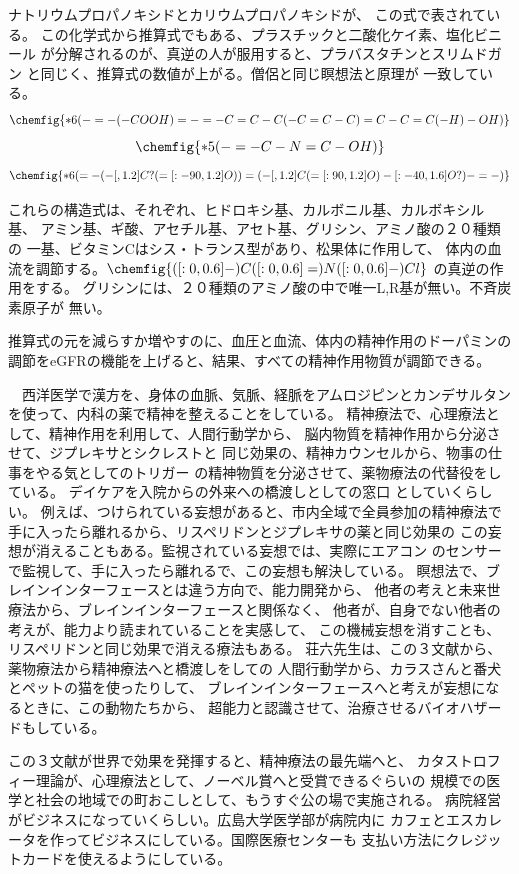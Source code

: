 \documentclass{jsarticle}
\begin{document}
    ナトリウムプロパノキシドとカリウムプロパノキシドが、
    この式で表されている。
   この化学式から推算式でもある、プラスチックと二酸化ケイ素、塩化ビニール
   が分解されるのが、真逆の人が服用すると、プラバスタチンとスリムドガン
   と同じく、推算式の数値が上がる。僧侶と同じ瞑想法と原理が
   一致している。
   $$ \chemfig{*6(-=-(-COOH)=-=-C=C-C(-C=C-C)=C-C=C(-H)-OH)} $$
   $$ \chemfig{*5(-=-C-N=C-OH)} $$
   $$ \chemfig{*6(=-(-[,1.2]C?(=[:-90,1.2]O))=
   (-[,1.2]C(=[:90,1.2]O)-[:-40,1.6]O?)-=-)} $$


     これらの構造式は、それぞれ、ヒドロキシ基、カルボニル基、カルボキシル基、
   アミン基、ギ酸、アセチル基、アセト基、グリシン、アミノ酸の２０種類の
   一基、ビタミンCはシス・トランス型があり、松果体に作用して、
   体内の血流を調節する。$ \chemfig{{}([:0,0.6]-)C([:0,0.6]=)N([:0,0.6]-)Cl} $
   の真逆の作用をする。
     グリシンには、２０種類のアミノ酸の中で唯一L,R基が無い。不斉炭素原子が
   無い。


     推算式の元を減らすか増やすのに、血圧と血流、体内の精神作用のドーパミンの
   調節をeGFRの機能を上げると、結果、すべての精神作用物質が調節できる。


 
    　西洋医学で漢方を、身体の血脈、気脈、経脈をアムロジピンとカンデサルタン
    を使って、内科の薬で精神を整えることをしている。
    精神療法で、心理療法として、精神作用を利用して、人間行動学から、
    脳内物質を精神作用から分泌させて、ジプレキサとシクレストと
    同じ効果の、精神カウンセルから、物事の仕事をやる気としてのトリガー
    の精神物質を分泌させて、薬物療法の代替役をしている。
    デイケアを入院からの外来への橋渡しとしての窓口
    としていくらしい。
    例えば、つけられている妄想があると、市内全域で全員参加の精神療法で
    手に入ったら離れるから、リスペリドンとジプレキサの薬と同じ効果の
    この妄想が消えることもある。監視されている妄想では、実際にエアコン
    のセンサーで監視して、手に入ったら離れるで、この妄想も解決している。
    瞑想法で、ブレインインターフェースとは違う方向で、能力開発から、
    他者の考えと未来世療法から、ブレインインターフェースと関係なく、
    他者が、自身でない他者の考えが、能力より読まれていることを実感して、
    この機械妄想を消すことも、リスペリドンと同じ効果で消える療法もある。
    荘六先生は、この３文献から、薬物療法から精神療法へと橋渡しをしての
    人間行動学から、カラスさんと番犬とペットの猫を使ったりして、
    ブレインインターフェースへと考えが妄想になるときに、この動物たちから、
    超能力と認識させて、治療させるバイオハザードもしている。

    この３文献が世界で効果を発揮すると、精神療法の最先端へと、
    カタストロフィー理論が、心理療法として、ノーベル賞へと受賞できるぐらいの
    規模での医学と社会の地域での町おこしとして、もうすぐ公の場で実施される。
    病院経営がビジネスになっていくらしい。広島大学医学部が病院内に
    カフェとエスカレータを作ってビジネスにしている。国際医療センターも
    支払い方法にクレジットカードを使えるようにしている。
  
\end{document}
